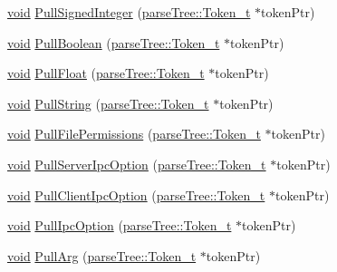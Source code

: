 \begin{DoxyCompactItemize}
\item 
\hyperlink{_t_e_m_p_l_a_t_e__cdef_8h_ac9c84fa68bbad002983e35ce3663c686}{void} \hyperlink{class_lexer__t_a3a4c24b60477e4be1683669f35f3a139}{Pull\+Signed\+Integer} (\hyperlink{structparse_tree_1_1_token__t}{parse\+Tree\+::\+Token\+\_\+t} $\ast$token\+Ptr)
\item 
\hyperlink{_t_e_m_p_l_a_t_e__cdef_8h_ac9c84fa68bbad002983e35ce3663c686}{void} \hyperlink{class_lexer__t_a7b06370f06ca258f96d7dafc61daf8ef}{Pull\+Boolean} (\hyperlink{structparse_tree_1_1_token__t}{parse\+Tree\+::\+Token\+\_\+t} $\ast$token\+Ptr)
\item 
\hyperlink{_t_e_m_p_l_a_t_e__cdef_8h_ac9c84fa68bbad002983e35ce3663c686}{void} \hyperlink{class_lexer__t_a3eb9c81f3a290c691396c32e91f26b10}{Pull\+Float} (\hyperlink{structparse_tree_1_1_token__t}{parse\+Tree\+::\+Token\+\_\+t} $\ast$token\+Ptr)
\item 
\hyperlink{_t_e_m_p_l_a_t_e__cdef_8h_ac9c84fa68bbad002983e35ce3663c686}{void} \hyperlink{class_lexer__t_aa5d78865c41dacdd53e5583a0036e4d2}{Pull\+String} (\hyperlink{structparse_tree_1_1_token__t}{parse\+Tree\+::\+Token\+\_\+t} $\ast$token\+Ptr)
\item 
\hyperlink{_t_e_m_p_l_a_t_e__cdef_8h_ac9c84fa68bbad002983e35ce3663c686}{void} \hyperlink{class_lexer__t_a2adf3628e5a579881e04f54a02235c64}{Pull\+File\+Permissions} (\hyperlink{structparse_tree_1_1_token__t}{parse\+Tree\+::\+Token\+\_\+t} $\ast$token\+Ptr)
\item 
\hyperlink{_t_e_m_p_l_a_t_e__cdef_8h_ac9c84fa68bbad002983e35ce3663c686}{void} \hyperlink{class_lexer__t_a45ecae9c19773b954902b27f59c18464}{Pull\+Server\+Ipc\+Option} (\hyperlink{structparse_tree_1_1_token__t}{parse\+Tree\+::\+Token\+\_\+t} $\ast$token\+Ptr)
\item 
\hyperlink{_t_e_m_p_l_a_t_e__cdef_8h_ac9c84fa68bbad002983e35ce3663c686}{void} \hyperlink{class_lexer__t_a9afcff0c0263af2435b0fd7bf17db634}{Pull\+Client\+Ipc\+Option} (\hyperlink{structparse_tree_1_1_token__t}{parse\+Tree\+::\+Token\+\_\+t} $\ast$token\+Ptr)
\item 
\hyperlink{_t_e_m_p_l_a_t_e__cdef_8h_ac9c84fa68bbad002983e35ce3663c686}{void} \hyperlink{class_lexer__t_ab8c5fa6f0f981479c827d85a129fb7b2}{Pull\+Ipc\+Option} (\hyperlink{structparse_tree_1_1_token__t}{parse\+Tree\+::\+Token\+\_\+t} $\ast$token\+Ptr)
\item 
\hyperlink{_t_e_m_p_l_a_t_e__cdef_8h_ac9c84fa68bbad002983e35ce3663c686}{void} \hyperlink{class_lexer__t_ab6b0baeee2ac09b41527719eb7a3c31c}{Pull\+Arg} (\hyperlink{structparse_tree_1_1_token__t}{parse\+Tree\+::\+Token\+\_\+t} $\ast$token\+Ptr)

\end{DoxyCompactItemize}

